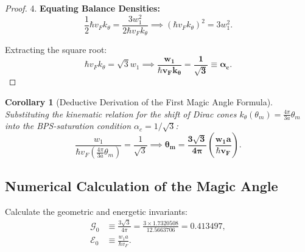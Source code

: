 \documentclass[12pt,a4paper]{article}
\newtheorem{corollary}{Corollary}
\begin{document}
\begin{proof}
	4. \textbf{Equating Balance Densities:}\\
	\begin{equation}
		\frac{1}{2} \hbar v_F k_\theta = \frac{3 w_1^2}{2 \hbar v_F k_\theta} \implies (\hbar v_F k_\theta)^2 = 3 w_1^2.
	\end{equation}
			
	Extracting the square root:
	\begin{equation}
	\hbar v_F k_\theta = \sqrt{3} w_1 \implies \mathbf{\frac{w_1}{\hbar v_F k_\theta} = \frac{1}{\sqrt{3}} \equiv \alpha_c}.
	\end{equation}
	\end{proof}
		
\begin{corollary}[Deductive Derivation of the First Magic Angle Formula]
Substituting the kinematic relation for the shift of Dirac cones $k_\theta(\theta_m) = \frac{4\pi}{3 a} \theta_m$ into the BPS-saturation condition $\alpha_c = 1/\sqrt{3}$:
\begin{equation}
\frac{w_1}{\hbar v_F \left( \frac{4\pi}{3 a} \theta_m \right)} = \frac{1}{\sqrt{3}} \implies \mathbf{\theta_m = \frac{3\sqrt{3}}{4\pi} \left( \frac{w_1 a}{\hbar v_F} \right)}.
\end{equation}
\end{corollary}
		
\subsection{Numerical Calculation of the Magic Angle}
Calculate the geometric and energetic invariants:
\begin{align}
\mathcal{G}_0 &\equiv \frac{3\sqrt{3}}{4\pi} = \frac{3 \times 1.7320508}{12.5663706} = \mathbf{0.413497}, \\
\mathcal{E}_0 &\equiv \frac{w_1 a}{\hbar v_F}.
\end{align}
		
\end{document}
